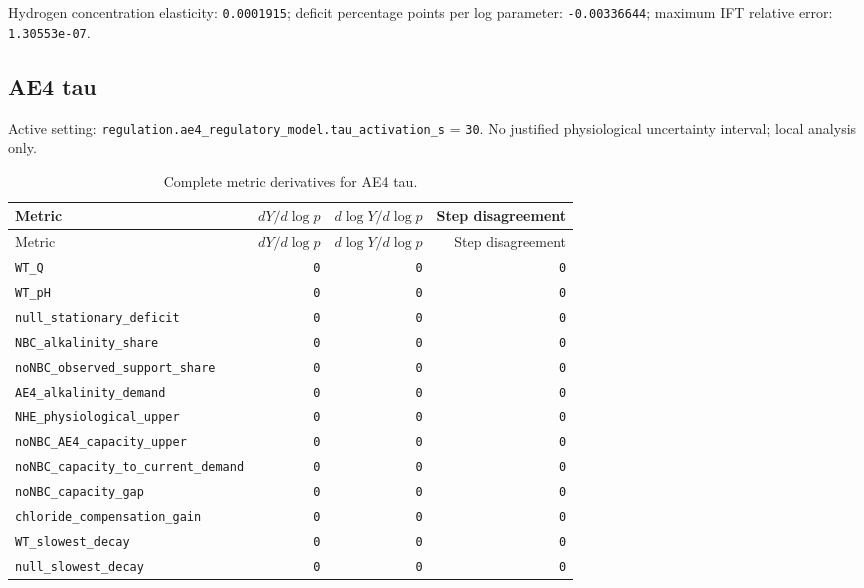 Hydrogen concentration elasticity: \texttt{0.0001915}; deficit percentage points per log parameter: \texttt{-0.00336644}; maximum IFT relative error: \texttt{1.30553e-07}.\par

\subsection*{AE4 tau}
Active setting: \nolinkurl{regulation.ae4_regulatory_model.tau_activation_s} = \texttt{30}. No justified physiological uncertainty interval; local analysis only.


\begingroup\scriptsize
\setlength{\tabcolsep}{3pt}
\begin{longtable}{p{.44\linewidth}rrr}
\caption{Complete metric derivatives for AE4 tau.}\\
\toprule
Metric & $dY/d\log p$ & $d\log Y/d\log p$ & Step disagreement \\
\midrule\endfirsthead
\toprule
Metric & $dY/d\log p$ & $d\log Y/d\log p$ & Step disagreement \\
\midrule\endhead
\bottomrule\endfoot
\nolinkurl{WT_Q} & \texttt{0} & \texttt{0} & \texttt{0} \\
\nolinkurl{WT_pH} & \texttt{0} & \texttt{0} & \texttt{0} \\
\nolinkurl{null_stationary_deficit} & \texttt{0} & \texttt{0} & \texttt{0} \\
\nolinkurl{NBC_alkalinity_share} & \texttt{0} & \texttt{0} & \texttt{0} \\
\nolinkurl{noNBC_observed_support_share} & \texttt{0} & \texttt{0} & \texttt{0} \\
\nolinkurl{AE4_alkalinity_demand} & \texttt{0} & \texttt{0} & \texttt{0} \\
\nolinkurl{NHE_physiological_upper} & \texttt{0} & \texttt{0} & \texttt{0} \\
\nolinkurl{noNBC_AE4_capacity_upper} & \texttt{0} & \texttt{0} & \texttt{0} \\
\nolinkurl{noNBC_capacity_to_current_demand} & \texttt{0} & \texttt{0} & \texttt{0} \\
\nolinkurl{noNBC_capacity_gap} & \texttt{0} & \texttt{0} & \texttt{0} \\
\nolinkurl{chloride_compensation_gain} & \texttt{0} & \texttt{0} & \texttt{0} \\
\nolinkurl{WT_slowest_decay} & \texttt{0} & \texttt{0} & \texttt{0} \\
\nolinkurl{null_slowest_decay} & \texttt{0} & \texttt{0} & \texttt{0} \\
\end{longtable}
\endgroup

